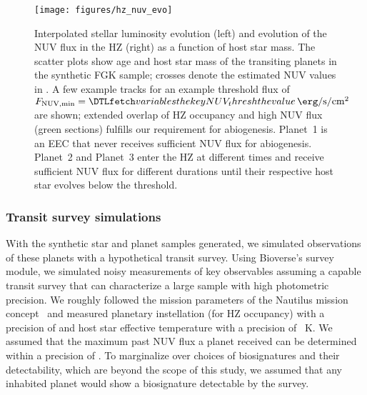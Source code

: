 \documentclass[twocolumn,twocolappendix,linenumbers]{aastex631}
\begin{document}
\begin{figure*}
    \begin{centering}
        \texttt{[image: figures/hz\_nuv\_evo]}
        \caption{Interpolated stellar luminosity evolution (left) and evolution of the \gls{NUV} flux in the \gls{HZ} (right) as a function of host star mass.
        The scatter plots show age and host star mass of the transiting planets in the synthetic FGK sample; crosses denote the estimated \gls{NUV} values in \citet{Richey-Yowell2019}. %
        A few example tracks for an example threshold flux of $F_\mathrm{NUV, min} = \var{NUV_thresh}\,\SI{}{\erg\per\second\per\centi\meter\squared}$ are shown; extended overlap of \gls{HZ} occupancy and high \gls{NUV} flux (green sections) fulfills our requirement for abiogenesis.
        Planet~1 is an \gls{EEC} that never receives sufficient \gls{NUV} flux for abiogenesis.
        Planet~2 and Planet~3 enter the \gls{HZ} at different times and receive sufficient \gls{NUV} flux for different durations until their respective host star evolves below the threshold.
        }
        \label{fig:hz_nuv_evo}
    \end{centering}
\end{figure*}





\subsubsection{Transit survey simulations}
With the synthetic star and planet samples generated, we simulated observations of these planets with a hypothetical transit survey.
Using Bioverse's survey module, we simulated noisy measurements of key observables assuming a capable transit survey that can characterize a large sample with high photometric precision.
We roughly followed the mission parameters of the Nautilus mission concept~\citep{Apai2019,Apai2022} and measured planetary instellation (for \gls{HZ} occupancy) with a precision of  and host star effective temperature with a precision of ~K.
We assumed that the maximum past \gls{NUV} flux a planet received can be determined within a precision of .
To marginalize over choices of biosignatures and their detectability, which are beyond the scope of this study, we assumed that any inhabited planet would show a biosignature detectable by the survey.
\end{document}
